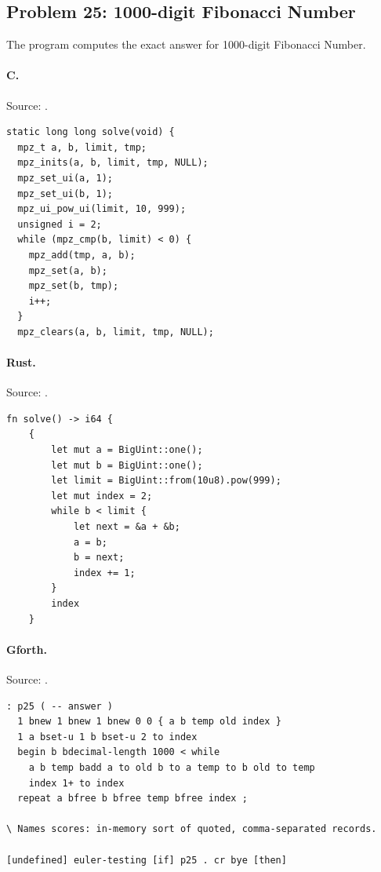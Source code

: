 \subsection{Problem 25: 1000-digit Fibonacci Number}
\label{walkthrough:p25}
The program computes the exact answer for 1000-digit Fibonacci Number.

\paragraph{C.} Source: .
\begin{lstlisting}
static long long solve(void) {
  mpz_t a, b, limit, tmp;
  mpz_inits(a, b, limit, tmp, NULL);
  mpz_set_ui(a, 1);
  mpz_set_ui(b, 1);
  mpz_ui_pow_ui(limit, 10, 999);
  unsigned i = 2;
  while (mpz_cmp(b, limit) < 0) {
    mpz_add(tmp, a, b);
    mpz_set(a, b);
    mpz_set(b, tmp);
    i++;
  }
  mpz_clears(a, b, limit, tmp, NULL);
\end{lstlisting}

\paragraph{Rust.} Source: .
\begin{lstlisting}
fn solve() -> i64 {
    {
        let mut a = BigUint::one();
        let mut b = BigUint::one();
        let limit = BigUint::from(10u8).pow(999);
        let mut index = 2;
        while b < limit {
            let next = &a + &b;
            a = b;
            b = next;
            index += 1;
        }
        index
    }
\end{lstlisting}

\paragraph{Gforth.} Source: .
\begin{lstlisting}
: p25 ( -- answer )
  1 bnew 1 bnew 1 bnew 0 0 { a b temp old index }
  1 a bset-u 1 b bset-u 2 to index
  begin b bdecimal-length 1000 < while
    a b temp badd a to old b to a temp to b old to temp
    index 1+ to index
  repeat a bfree b bfree temp bfree index ;

\ Names scores: in-memory sort of quoted, comma-separated records.

[undefined] euler-testing [if] p25 . cr bye [then]
\end{lstlisting}


